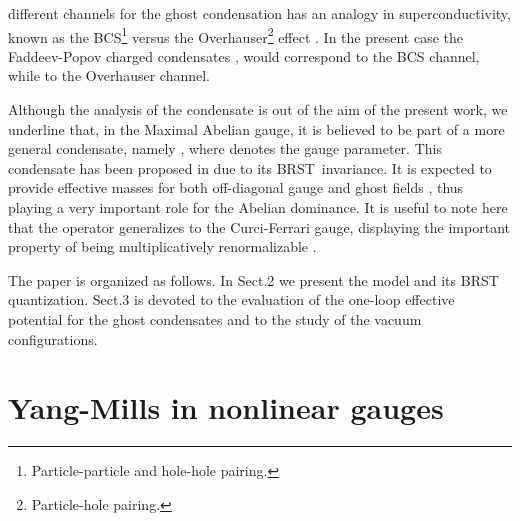 \documentclass[a4paper,12pt]{article}
\begin{document}
different channels for the ghost condensation has an analogy in
superconductivity, known as the BCS\footnote{%
Particle-particle and hole-hole pairing.} versus the Overhauser\footnote{%
Particle-hole pairing.} effect \cite{ov}. In the present case the
Faddeev-Popov charged condensates \coordHE{}, \coordHE{} would correspond to the BCS
channel, while \coordHE{} to the Overhauser channel.

Although the analysis of the condensate \coordHE{} is out of the aim of the present work, we
underline that, in the Maximal Abelian gauge, it is believed to be part of a
more general condensate, namely \coordHE{}, where \myHighlight{$\xi $}\coordHE{} denotes the gauge
parameter. This condensate has been proposed in \cite{ope} due to its BRST\
invariance. It is expected to provide effective masses for both off-diagonal
gauge and ghost fields \cite{dd,ope}, thus playing a very important role for
the Abelian dominance. It is useful to note here that the operator \myHighlight{$\left( 
\frac{1}{2}A^{2}-\xi \overline{c}c\right) $}\coordHE{} generalizes to the Curci-Ferrari
gauge, displaying the important property of being multiplicatively
renormalizable \cite{mr,mr1}.

The paper is organized as follows. In Sect.2 we present the model and its
BRST quantization. Sect.3 is devoted to the evaluation of the one-loop
effective potential for the ghost condensates and to the study of the vacuum
configurations.

\section{Yang-Mills in nonlinear gauges}
\end{document}
